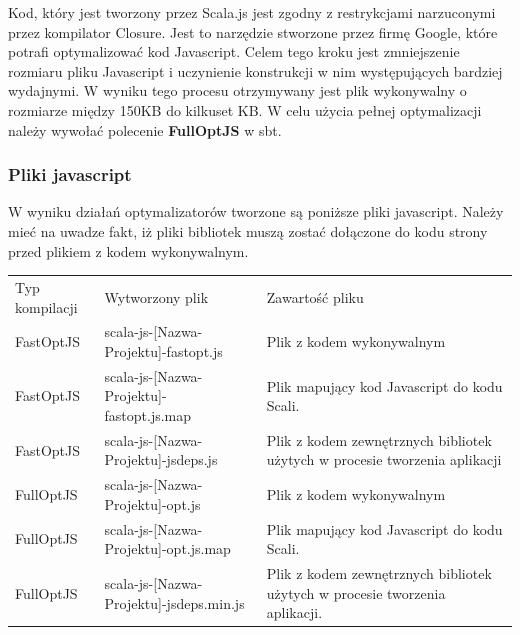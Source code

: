 Kod, który jest tworzony przez Scala.js jest zgodny z restrykcjami narzuconymi przez kompilator Closure\cite{Closure}. Jest to narzędzie stworzone przez firmę Google, które potrafi optymalizować kod Javascript.\cite{ClosureCompiler} Celem tego kroku jest zmniejszenie rozmiaru pliku Javascript i uczynienie konstrukcji w nim występujących bardziej wydajnymi.
W wyniku tego procesu otrzymywany jest plik wykonywalny o rozmiarze między 150KB do kilkuset KB\cite{ScalaCompilationProcess}.
W celu użycia pełnej optymalizacji należy wywołać polecenie \textbf{FullOptJS} w sbt.

\subsubsection{Pliki javascript}
\label{sub:javascriptfiles}

W wyniku działań optymalizatorów tworzone są poniższe pliki javascript. Należy mieć na uwadze fakt, iż pliki bibliotek muszą zostać dołączone do kodu strony przed plikiem z kodem wykonywalnym.

\begin{center}
\begin{tabular}{| l | l | p{6cm} |}
\hline
Typ kompilacji & Wytworzony plik & Zawartość pliku \\ \Xhline{3\arrayrulewidth}

FastOptJS & scala-js-[Nazwa-Projektu]-fastopt.js & Plik z kodem wykonywalnym \\ \hline

FastOptJS & scala-js-[Nazwa-Projektu]-fastopt.js.map & Plik mapujący kod Javascript do kodu Scali. \\ \hline

FastOptJS & scala-js-[Nazwa-Projektu]-jsdeps.js & Plik z kodem zewnętrznych bibliotek użytych w procesie tworzenia aplikacji \\ \hline

 \Xhline{2\arrayrulewidth}

FullOptJS & scala-js-[Nazwa-Projektu]-opt.js & Plik z kodem wykonywalnym \\ \hline

FullOptJS & scala-js-[Nazwa-Projektu]-opt.js.map & Plik mapujący kod Javascript do kodu Scali. \\ \hline

FullOptJS & scala-js-[Nazwa-Projektu]-jsdeps.min.js & Plik z kodem zewnętrznych bibliotek użytych w procesie tworzenia aplikacji. \\ \hline
\end{tabular}
\end{center}
